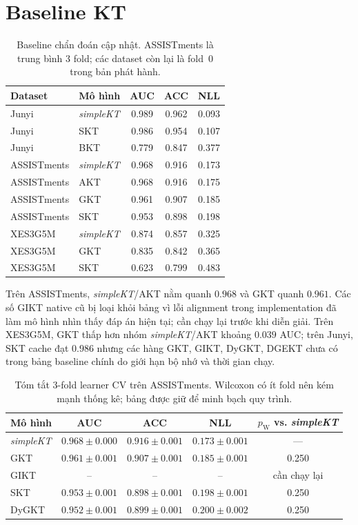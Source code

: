 \documentclass[runningheads]{llncs}
\begin{document}
\section{Baseline KT}
\begin{table}[t]
\centering
\footnotesize
\caption{Baseline chẩn đoán cập nhật. ASSISTments là trung bình 3 fold; các dataset còn lại là fold~0 trong bản phát hành.}
\label{tab:vi-baseline}
\begin{tabular}{@{}llccc@{}}
\toprule
Dataset & Mô hình & AUC & ACC & NLL \\
\midrule
Junyi & \textit{simpleKT} & 0.989 & 0.962 & 0.093 \\
Junyi & SKT & 0.986 & 0.954 & 0.107 \\
Junyi & BKT & 0.779 & 0.847 & 0.377 \\
\midrule
ASSISTments & \textit{simpleKT} & 0.968 & 0.916 & 0.173 \\
ASSISTments & AKT & 0.968 & 0.916 & 0.175 \\
ASSISTments & GKT & 0.961 & 0.907 & 0.185 \\
ASSISTments & SKT & 0.953 & 0.898 & 0.198 \\
\midrule
XES3G5M & \textit{simpleKT} & 0.874 & 0.857 & 0.325 \\
XES3G5M & GKT & 0.835 & 0.842 & 0.365 \\
XES3G5M & SKT & 0.623 & 0.799 & 0.483 \\
\bottomrule
\end{tabular}
\end{table}

Trên ASSISTments, \textit{simpleKT}/AKT nằm quanh $0.968$ và GKT quanh $0.961$. Các số GIKT native cũ bị loại khỏi bảng vì lỗi alignment trong implementation đã làm mô hình nhìn thấy đáp án hiện tại; cần chạy lại trước khi diễn giải. Trên XES3G5M, GKT thấp hơn nhóm \textit{simpleKT}/AKT khoảng $0.039$ AUC; trên Junyi, SKT cache đạt $0.986$ nhưng các hàng GKT, GIKT, DyGKT, DGEKT chưa có trong bảng baseline chính do giới hạn bộ nhớ và thời gian chạy.

\begin{table}[t]
\centering
\footnotesize
\caption{Tóm tắt 3-fold learner CV trên ASSISTments. Wilcoxon có ít fold nên kém mạnh thống kê; bảng được giữ để minh bạch quy trình.}
\label{tab:vi-cv}
\begin{tabular}{@{}lcccc@{}}
\toprule
Mô hình & AUC & ACC & NLL & $p_{\text{W}}$ vs. \textit{simpleKT} \\
\midrule
\textit{simpleKT} & $0.968 \pm 0.000$ & $0.916 \pm 0.001$ & $0.173 \pm 0.001$ & --- \\
GKT & $0.961 \pm 0.001$ & $0.907 \pm 0.001$ & $0.185 \pm 0.001$ & 0.250 \\
GIKT & -- & -- & -- & cần chạy lại \\
SKT & $0.953 \pm 0.001$ & $0.898 \pm 0.001$ & $0.198 \pm 0.001$ & 0.250 \\
DyGKT & $0.952 \pm 0.001$ & $0.899 \pm 0.001$ & $0.200 \pm 0.002$ & 0.250 \\
\bottomrule
\end{tabular}
\end{table}
\end{document}
